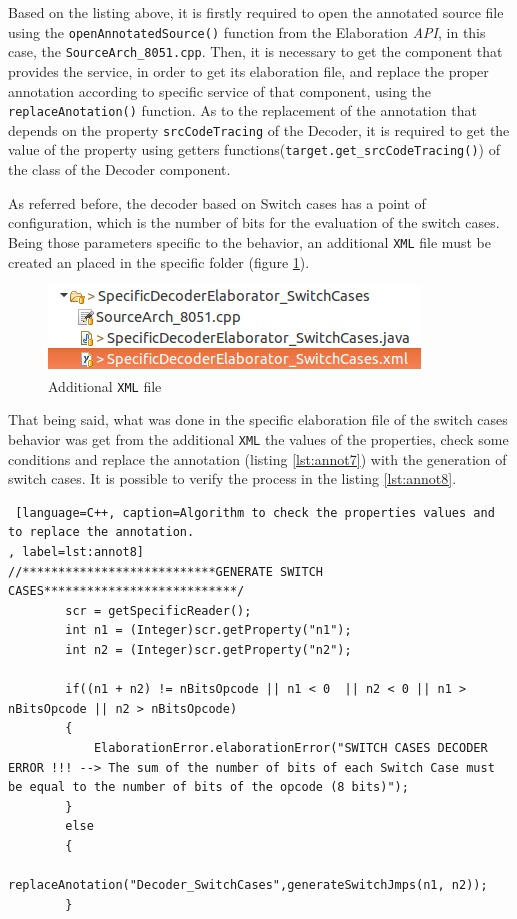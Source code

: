 Based on the listing above, it is firstly required to open the annotated source file using the \texttt{openAnnotatedSource()} function from the Elaboration \textit{API}, in this case, the \texttt{SourceArch\_8051.cpp}. Then, it is necessary to get the component that provides the service, in order to get its elaboration file, and replace the proper annotation according to specific service of that component, using the \texttt{replaceAnotation()} function. As to the replacement of the annotation that depends on the property \texttt{srcCodeTracing} of the Decoder, it is required to get the value of the property using getters functions(\texttt{target.get\_srcCodeTracing()}) of the class of the Decoder component.

As referred before, the decoder based on Switch cases has a point of configuration, which is the number of bits for the evaluation of the switch cases. Being those parameters specific to the behavior, an additional \texttt{XML} file must be created an placed in the specific folder (figure \ref{fig:decoder_spec10}).

\begin{figure}[H]
\centerline{
\includegraphics[scale=0.5]{images/spec10}
}
\caption{Additional \texttt{XML} file}
\label{fig:decoder_spec10}
\end{figure}

That being said, what was done in the specific elaboration file of the switch cases behavior was get from the additional \texttt{XML} the values of the properties, check some conditions and replace the annotation (listing \ref{lst:annot7}) with the generation of switch cases. It is possible to verify the process in the listing \ref{lst:annot8}.

\begin{lstlisting} [language=C++, caption=Algorithm to check the properties values and to replace the annotation.
, label=lst:annot8]
//***************************GENERATE SWITCH CASES***************************/			
		scr = getSpecificReader();
		int n1 = (Integer)scr.getProperty("n1");
		int n2 = (Integer)scr.getProperty("n2");
		
		if((n1 + n2) != nBitsOpcode || n1 < 0  || n2 < 0 || n1 > nBitsOpcode || n2 > nBitsOpcode)
		{
			ElaborationError.elaborationError("SWITCH CASES DECODER ERROR !!! --> The sum of the number of bits of each Switch Case must be equal to the number of bits of the opcode (8 bits)");
		}
		else
		{
			replaceAnotation("Decoder_SwitchCases",generateSwitchJmps(n1, n2));
		}
\end{lstlisting}


